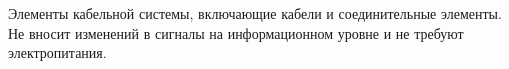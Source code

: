 Элементы кабельной системы, включающие кабели и 
соединительные элементы. Не вносит изменений в сигналы на 
информационном уровне и не требуют электропитания.